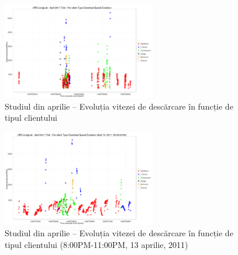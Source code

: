 \begin{figure}
  \centering
  \includegraphics[width=0.6\textwidth]{src/img/multimedia-dist/ds-evolution-full}
  \caption{Studiul din aprilie -- Evoluția vitezei de descărcare în funcție de
	  tipul clientului}
  \label{fig:multimedia-dist:ds-evolution-full}
\end{figure}

\begin{figure}
  \centering
  \includegraphics[width=0.6\textwidth]{src/img/multimedia-dist/ds-evolution-day}
  \caption{Studiul din aprilie -- Evoluția vitezei de descărcare în funcție de
	  tipul clientului (8:00PM-11:00PM, 13 aprilie, 2011)}
  \label{fig:multimedia-dist:ds-evolution-day}
\end{figure}
